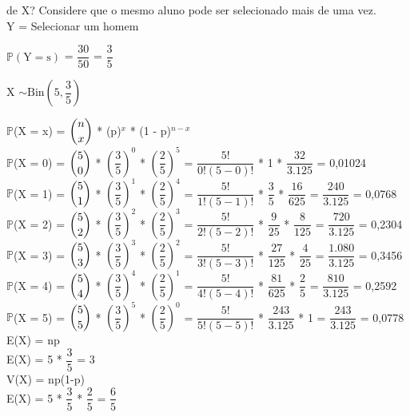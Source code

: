 \documentclass[12pt,a4paper,draft]{article}
\begin{document}
	de X? Considere que o mesmo aluno pode ser selecionado mais de uma vez.
	\vspace{0.5cm}\\
	Y = Selecionar um homem
	\begin{center}
		\vspace{1cm}
		$\mathbb{P}\left(\text{Y} = \text{s}\right)$ = $\dfrac{30}{50}$ = $\dfrac{3}{5}$
		\vspace{1cm}\\
	\end{center}
	X $\sim \text{Bin}\left(5, \dfrac{3}{5}\right)$
	\vspace{1cm}\\
	\begin{center}
		$\mathbb{P}$(X = x) = $\dbinom{n}{x}$ * (p)$^{x}$ * (1 - p)$^{n - x}$
		\vspace{1cm}\\
		$\mathbb{P}$(X = 0) = $\dbinom{5}{0}$ * $\left(\dfrac{3}{5}\right)^0$ * $\left(\dfrac{2}{5}\right)^5$ = $\dfrac{5!}{0!(5-0)!}$ * 1 * $\dfrac{32}{3.125}$ = 0,01024
		\vspace{0.5cm}\\
		$\mathbb{P}$(X = 1) = $\dbinom{5}{1}$ * $\left(\dfrac{3}{5}\right)^1$ * $\left(\dfrac{2}{5}\right)^4$ = $\dfrac{5!}{1!(5-1)!}$ * $\dfrac{3}{5}$ * $\dfrac{16}{625}$ = $\dfrac{240}{3.125}$ = 0,0768
		\vspace{0.5cm}\\
		$\mathbb{P}$(X = 2) = $\dbinom{5}{2}$ * $\left(\dfrac{3}{5}\right)^2$ * $\left(\dfrac{2}{5}\right)^3$ = $\dfrac{5!}{2!(5-2)!}$ * $\dfrac{9}{25}$ * $\dfrac{8}{125}$ = $\dfrac{720}{3.125}$ = 0,2304
		\vspace{1cm}\\
		$\mathbb{P}$(X = 3) = $\dbinom{5}{3}$ * $\left(\dfrac{3}{5}\right)^3$ * $\left(\dfrac{2}{5}\right)^2$ = $\dfrac{5!}{3!(5-3)!}$ * $\dfrac{27}{125}$ * $\dfrac{4}{25}$ = $\dfrac{1.080}{3.125}$ = 0,3456
		\vspace{0.5cm}\\
		$\mathbb{P}$(X = 4) = $\dbinom{5}{4}$ * $\left(\dfrac{3}{5}\right)^4$ * $\left(\dfrac{2}{5}\right)^1$ = $\dfrac{5!}{4!(5-4)!}$ * $\dfrac{81}{625}$ * $\dfrac{2}{5}$ = $\dfrac{810}{3.125}$ = 0,2592
		\vspace{0.5cm}\\
		$\mathbb{P}$(X = 5) = $\dbinom{5}{5}$ * $\left(\dfrac{3}{5}\right)^5$ * $\left(\dfrac{2}{5}\right)^0$ = $\dfrac{5!}{5!(5-5)!}$ * $\dfrac{243}{3.125}$ * 1 = $\dfrac{243}{3.125}$ = 0,0778
		\vspace{1cm}\\
		E(X) = np
		\vspace{0.5cm}\\
		E(X) = 5 * $\dfrac{3}{5}$ = 3
		\vspace{1cm}\\
		V(X) = np(1-p)
		\vspace{0.5cm}\\
		E(X) = 5 * $\dfrac{3}{5}$ * $\dfrac{2}{5}$ = $\dfrac{6}{5}$
	\end{center}
\end{document}
